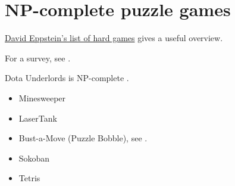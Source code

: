 

\section[npCompleteGames]{NP-complete puzzle games}

\href{https://www.ics.uci.edu/~eppstein/cgt/hard.html}{David Eppstein's list
of hard games} gives a useful overview.

For a survey, see \cite{KendallParkesSpoerer2008}.

Dota Underlords is NP-complete \cite{PonomarenkoSirotkin2020x}.


\begin{itemize}

\item Minesweeper

\item LaserTank 

\item Bust-a-Move (Puzzle Bobble), see \cite{DemaineLangerman2016}.

\item Sokoban

\item Tetris


\end{itemize}
